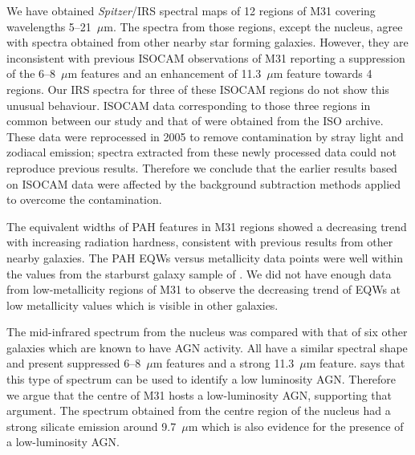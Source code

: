 We have obtained {\em Spitzer}/IRS spectral maps of 12 regions of M31 covering wavelengths 5--21~$\mu$m. 
The spectra from those regions, except the nucleus, agree with spectra obtained from other nearby  star forming galaxies. 
However, they are inconsistent with previous ISOCAM observations of M31 \citep{1998Cesarsky} reporting a suppression 
of the 6--8~$\mu$m features and an enhancement of 11.3~$\mu$m feature towards 4 regions. 
Our IRS spectra for three of these ISOCAM regions do not show this unusual behaviour. 
ISOCAM data corresponding to those three regions in common between our study and that of \citep{1998Cesarsky} 
were obtained from the ISO archive. These data were reprocessed in 2005 to remove contamination by stray light and zodiacal emission; 
spectra extracted from these newly processed data could not reproduce previous results. 
Therefore we conclude that the earlier results based on ISOCAM data were affected by the background subtraction methods applied to overcome the contamination.
%


The equivalent widths of PAH features in M31 regions showed a decreasing trend with increasing radiation hardness, consistent with previous 
results from other nearby galaxies. The PAH EQWs versus metallicity data points were well within the values from the starburst galaxy sample of \citet{Engelbracht_2008}. 
We did not have enough data from low-metallicity regions of M31 to observe the decreasing trend of EQWs at low metallicity values which is visible in other galaxies.

The mid-infrared spectrum from the nucleus was compared with that of six other galaxies which are known to have AGN activity. 
All have a similar spectral shape and present suppressed 6--8~$\mu$m features and a strong 11.3~$\mu$m feature. 
\citealt{Smith:2007lr} says that this type of spectrum can be used to identify a low luminosity AGN. 
Therefore we argue that the centre of M31 hosts a low-luminosity AGN, supporting that argument. %
The spectrum obtained from the centre region of the nucleus had a strong silicate emission around 9.7~$\mu$m which is also evidence for the presence of a low-luminosity AGN.


